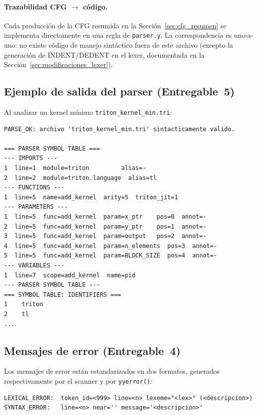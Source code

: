 \paragraph{Trazabilidad CFG $\to$ código.}
Cada producción de la CFG resumida en la Sección~\ref{sec:cfg_resumen}
se implementa directamente en una regla de \texttt{parser.y}. La
correspondencia es uno-a-uno: no existe código de manejo sintáctico fuera
de este archivo (excepto la generación de INDENT/DEDENT en el lexer,
documentada en la Sección~\ref{sec:modificaciones_lexer}).



\subsection{Ejemplo de salida del parser (Entregable~5)}

Al analizar un kernel mínimo \texttt{triton\_kernel\_min.tri}:
\begin{verbatim}
PARSE_OK: archivo 'triton_kernel_min.tri' sintacticamente valido.

=== PARSER SYMBOL TABLE ===
--- IMPORTS ---
1  line=1  module=triton         alias=-
2  line=2  module=triton.language  alias=tl
--- FUNCTIONS ---
1  line=5  name=add_kernel  arity=5  triton_jit=1
--- PARAMETERS ---
1  line=5  func=add_kernel  param=x_ptr    pos=0  annot=-
2  line=5  func=add_kernel  param=y_ptr    pos=1  annot=-
3  line=5  func=add_kernel  param=output   pos=2  annot=-
4  line=5  func=add_kernel  param=n_elements  pos=3  annot=-
5  line=5  func=add_kernel  param=BLOCK_SIZE  pos=4  annot=-
--- VARIABLES ---
1  line=7  scope=add_kernel  name=pid
--- PARSER SYMBOL TABLE ---
=== SYMBOL TABLE: IDENTIFIERS ===
1    triton
2    tl
...
\end{verbatim}

\subsection{Mensajes de error (Entregable~4)}

Los mensajes de error están estandarizados en dos formatos, generados
respectivamente por el scanner y por \texttt{yyerror()}:

\begin{verbatim}
LEXICAL_ERROR:  token_id=<999> line=<n> lexeme="<lex>" (<descripcion>)
SYNTAX_ERROR:   line=<n> near='' message='<descripcion>'
\end{verbatim}

